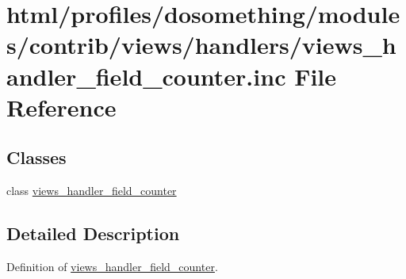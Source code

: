 \hypertarget{views__handler__field__counter_8inc}{
\section{html/profiles/dosomething/modules/contrib/views/handlers/views\_\-handler\_\-field\_\-counter.inc File Reference}
\label{views__handler__field__counter_8inc}
}
\subsection*{Classes}
\begin{DoxyCompactItemize}
\item 
class \hyperlink{classviews__handler__field__counter}{views\_\-handler\_\-field\_\-counter}
\end{DoxyCompactItemize}


\subsection{Detailed Description}
Definition of \hyperlink{classviews__handler__field__counter}{views\_\-handler\_\-field\_\-counter}. 
